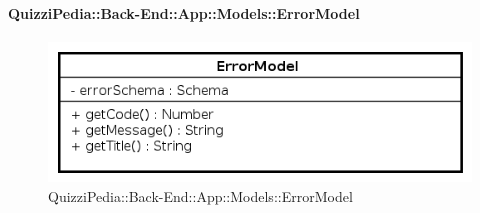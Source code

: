 \paragraph{QuizziPedia::Back-End::App::Models::ErrorModel}
\label{QuizziPedia::Back-End::App::Models::ErrorModel}
\begin{figure}[ht]
	\centering
	\includegraphics[scale=0.45]{UML/Classi/Back-End/QuizziPedia_Back-End_App_Models_errorModel.png}
	\caption{QuizziPedia::Back-End::App::Models::ErrorModel}
\end{figure}
\FloatBarrier
